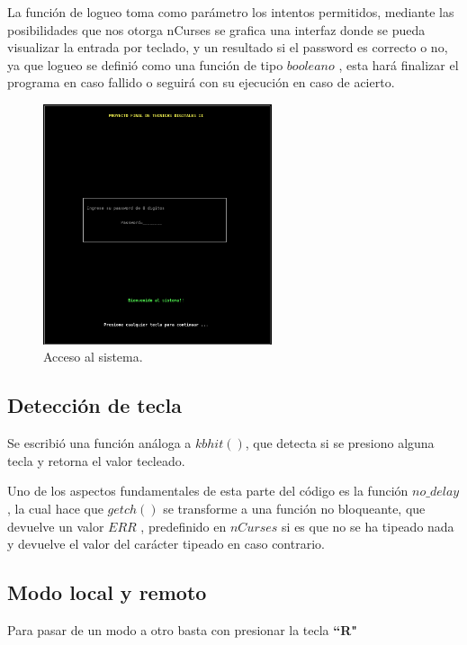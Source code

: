 \documentclass[11pt, a4paper]{article}
\begin{document}
La función de logueo toma como parámetro los intentos permitidos, mediante las posibilidades que nos otorga nCurses se grafica una interfaz donde se pueda visualizar la entrada por teclado, y un resultado si el password es correcto o no, ya que logueo se definió como una función de tipo $booleano$ , esta hará finalizar el programa en caso fallido o seguirá con su ejecución en caso de acierto. 
\begin{figure}[H]
	\centering
	\includegraphics[width = 0.6\textwidth]{Imagenes/ingreso.png}
	\caption{Acceso al sistema.}
	\label{fig:pass}
\end{figure}

\subsection {Detección de tecla}
Se escribió una función análoga a $kbhit()$, que detecta si se presiono alguna tecla y retorna el valor tecleado.



Uno de los aspectos fundamentales de esta parte del código es la función $no\_delay$, la cual hace que $getch()$ se transforme a una función no bloqueante, que devuelve un valor $ERR$ , predefinido en $nCurses$ si es que no se ha tipeado nada y devuelve el valor del carácter tipeado en caso contrario.

\subsection {Modo local y remoto}
Para pasar de un modo a otro basta con presionar la tecla \textbf{``R"}

\end{document}
